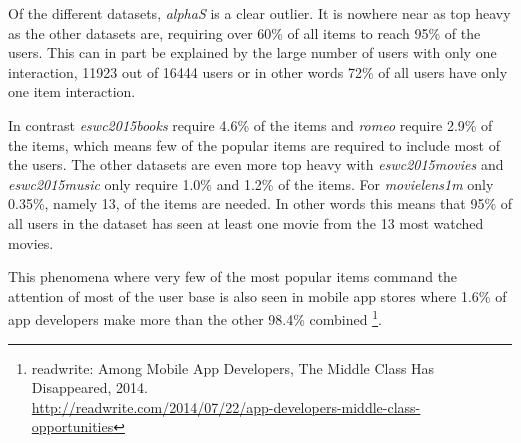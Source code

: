 Of the different datasets, \textit{alphaS} is a clear outlier. It is nowhere near as top heavy as the other datasets are, requiring over 60\% of all items to reach 95\% of the users. This can in part be explained by the large number of users with only one interaction, 11923 out of 16444 users or in other words 72\% of all users have only one item interaction.

In contrast \textit{eswc2015books} require 4.6\% of the items and \textit{romeo} require 2.9\% of the items, which means few of the popular items are required to include most of the users. The other datasets are even more top heavy with \textit{eswc2015movies} and \textit{eswc2015music} only require 1.0\% and 1.2\% of the items. For \textit{movielens1m} only 0.35\%, namely 13, of the items are needed. In other words this means that 95\% of all users in the dataset has seen at least one movie from the 13 most watched movies.

This phenomena where very few of the most popular items command the attention of most of the user base is also seen in mobile app stores where 1.6\% of app developers make more than the other 98.4\% combined
\footnote{
readwrite: Among Mobile App Developers, The Middle Class Has Disappeared, 2014. \\
\url{http://readwrite.com/2014/07/22/app-developers-middle-class-opportunities}
}.

\FloatBarrier
